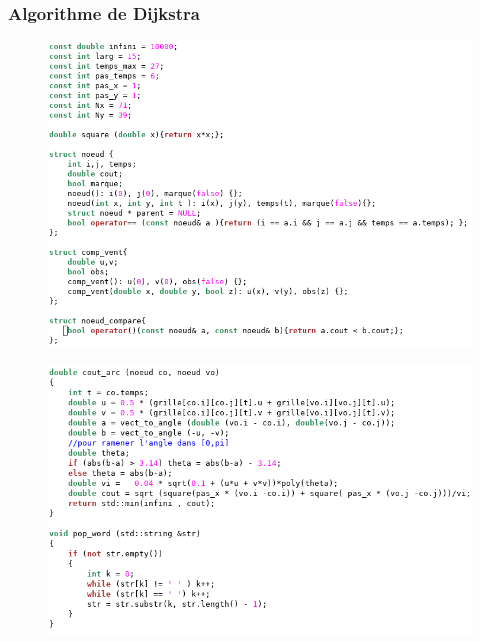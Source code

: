 \documentclass{beamer}
\begin{document}
\begin{frame}[plain]\frametitle{Algorithme de Dijkstra}
\begin{figure}
\includegraphics[scale=0.35]{dij1.png} 
\end{figure}
\end{frame}

\begin{frame}[plain]
\begin{figure}
\includegraphics[scale=0.35]{dij2.png} 
\end{figure}
\end{frame}
\end{document}
